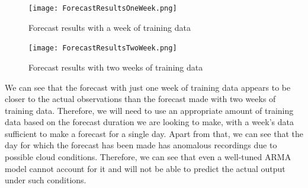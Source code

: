 \documentclass[journal]{IEEEtran}
\begin{document}
\begin{figure}[H]
	\centering
	\texttt{[image: ForecastResultsOneWeek.png]}
	\caption{Forecast results with a week of training data}
	\label{fig5} %
\end{figure}

\begin{figure}[H]
	\centering
	\texttt{[image: ForecastResultsTwoWeek.png]}
	\caption{Forecast results with two weeks of training data}
	\label{fig6} %
\end{figure}

We can see that the forecast with just one week of training data appears to be closer to the actual observations than the forecast made with two weeks of training data. Therefore, we will need to use an appropriate amount of training data based on the forecast duration we are looking to make, with a week's data sufficient to make a forecast for a single day.
Apart from that, we can see that the day for which the forecast has been made has anomalous recordings due to possible cloud conditions. Therefore, we can see that even a well-tuned ARMA model cannot account for it and will not be able to predict the actual output under such conditions.

%
%

\end{document}
